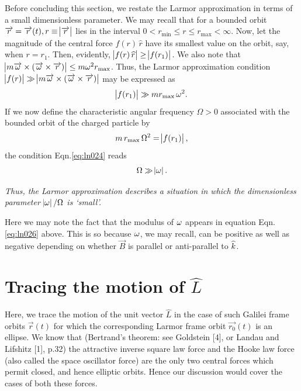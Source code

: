 Before concluding this section, we restate the Larmor 
approximation in terms of a small dimensionless parameter. 
We may recall that for a bounded orbit $\overrightarrow{r} = 
\overrightarrow{r}(t), r \equiv \abs{\overrightarrow{r}}$ lies in the interval 
$0<r_{\min}\leq r \leq r_{\max} < \infty$. Now, let the 
magnitude of the central force $f(r)\,\hat{r}$ have its 
smallest value on the orbit, say, when $r = r_{1}$. Then, 
evidently, $\abs{f(r)\,{\widehat{r}}} \geq \abs{f(r_{1})}$. We 
also note that 
$\abs{m{\overrightarrow{{\omega}}}\times{({\overrightarrow{\ensuremath{{\omega}}}}}\times{\overrightarrow{r}})} 
\leq m{\omega}^2r_{\max}$. Thus, the Larmor approximation 
condition  
$\abs{f(r)} \gg \abs{m{\overrightarrow{{\omega}}}\times{({\overrightarrow{\ensuremath{{\omega}}}}} 
\times{\overrightarrow{r}})}$ may be expressed as
\begin{align}
 \abs{f(r_{1})} \gg m r_{\max}\,{\omega}^2.
\label{eq:ln024}
\end{align}
If we now define the characteristic angular frequency
$\Omega>0$ associated with the bounded orbit of the
charged particle by
\begin{align}
 m\,{r}_{\max}\,\Omega^2 = \abs{f(r_{1})},
\label{eq:ln025}
\end{align}
the condition Eqn.\eqref{eq:ln024} reads
\begin{align}
 \Omega\gg \abs{{\omega}}.
\label{eq:ln026}
\end{align}

\textsl{Thus, the Larmor approximation describes a 
situation 
in which the dimensionless parameter  $\abs{{\omega}}/\Omega$ 
is 
`small'. }

Here we may note the fact that the modulus of ${\omega}$ 
appears 
in equation  Eqn.\eqref{eq:ln026} above. This is so because 
${\omega}$, we may recall, can be positive as well as negative 
depending on whether $\vec{B}$ is parallel or anti-parallel 
to ${\widehat{k}}$. 

\vspace{-.2cm}

\section{Tracing the motion of {$\hat{L}$}}

Here, we trace the motion 
of the unit vector $\hat{L}$ in the case of such Galilei 
frame orbits $\vec{r}(t)$ for which the corresponding 
Larmor 
frame orbit $\vec{r_{0}}(t)$ is an ellipse. We know that 
(Bertrand's theorem: see Goldstein [4], or Landau and 
Lifshitz [1], p.32) the attractive inverse square law force 
and the Hooke law force (also called the space oscillator 
force) are the only two central forces which permit closed, 
and hence elliptic orbits. Hence our discussion would cover 
the cases of both these forces.

